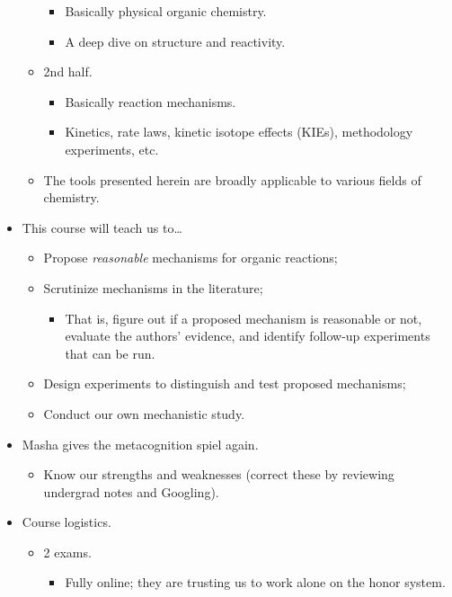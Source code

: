 \documentclass[../notes.tex]{subfiles}
\begin{document}
\begin{itemize}
\begin{itemize}
\begin{itemize}
            \item Basically physical organic chemistry.
            \item A deep dive on structure and reactivity.
        \end{itemize}
        \item 2nd half.
        \begin{itemize}
            \item Basically reaction mechanisms.
            \item Kinetics, rate laws, kinetic isotope effects (KIEs), methodology experiments, etc.
        \end{itemize}
        \item The tools presented herein are broadly applicable to various fields of chemistry.
    \end{itemize}
    \item This course will teach us to\dots
    \begin{itemize}
        \item Propose \emph{reasonable} mechanisms for organic reactions;
        \item Scrutinize mechanisms in the literature;
        \begin{itemize}
            \item That is, figure out if a proposed mechanism is reasonable or not, evaluate the authors' evidence, and identify follow-up experiments that can be run.
        \end{itemize}
        \item Design experiments to distinguish and test proposed mechanisms;
        \item Conduct our own mechanistic study.
    \end{itemize}
    \pagebreak
    \item Masha gives the metacognition spiel again.
    \begin{itemize}
        \item Know our strengths and weaknesses (correct these by reviewing undergrad notes and Googling).
    \end{itemize}
    \item Course logistics.
    \begin{itemize}
        \item 2 exams.
        \begin{itemize}
            \item Fully online; they are trusting us to work alone on the honor system.
        \end{itemize}

\end{itemize}
\end{itemize}
\end{document}
